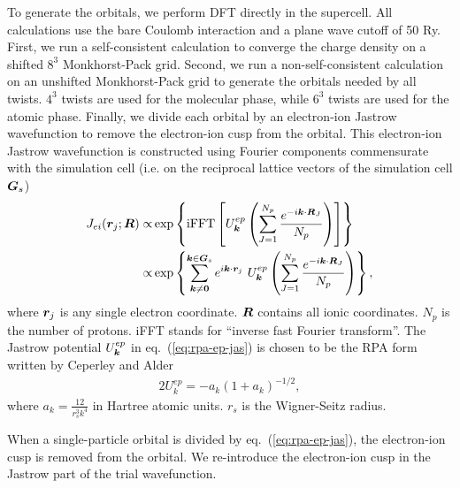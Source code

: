 To generate the orbitals, we perform DFT directly in the supercell. All calculations use the bare Coulomb interaction and a plane wave cutoff of 50 Ry. First, we run a self-consistent calculation to converge the charge density on a shifted $8^3$ Monkhorst-Pack grid. Second, we run a non-self-consistent calculation on an unshifted Monkhorst-Pack grid to generate the orbitals needed by all twists. $4^3$ twists are used for the molecular phase, while $6^3$ twists are used for the atomic phase. Finally, we divide each orbital by an electron-ion Jastrow wavefunction to remove the electron-ion cusp from the orbital. This electron-ion Jastrow wavefunction is constructed using Fourier components commensurate with the simulation cell (i.e. on the reciprocal lattice vectors of the simulation cell $\boldsymbol{G}_s$)
\begin{align}
J_{ei}(\boldsymbol{r}_j; \boldsymbol{R}) \propto& \exp\left\{ \text{iFFT}\left[ 
U_{\boldsymbol{k}}^{ep}  \left(\sum\limits_{J=1}^{N_p} \frac{e^{-i\boldsymbol{k}\cdot\boldsymbol{R}_J}}{N_p}  \right)
\right] \right\} \nonumber\\
\propto& \exp\left\{ 
\sum\limits_{\boldsymbol{k}\neq\boldsymbol{0}}^{\boldsymbol{k}\in\boldsymbol{G}_s} e^{i\boldsymbol{k}\cdot\boldsymbol{r}_j}~
U_{\boldsymbol{k}}^{ep} 
\left(\sum\limits_{J=1}^{N_p} \frac{e^{-i\boldsymbol{k}\cdot\boldsymbol{R}_J}}{N_p}  \right)
\right\},\label{eq:rpa-ep-jas}
\end{align}
where $\boldsymbol{r}_j$ is any single electron coordinate. $\boldsymbol{R}$ contains all ionic coordinates. $N_p$ is the number of protons. iFFT stands for ``inverse fast Fourier transform''. The Jastrow potential $U_{\boldsymbol{k}}^{ep}$ in eq.~(\ref{eq:rpa-ep-jas}) is chosen to be the RPA form written by Ceperley and Alder
\begin{align}
2U^{ep}_k = -a_k(1+a_k)^{-1/2},
\end{align}
where $a_k=\frac{12}{r_s^3k^4}$ in Hartree atomic units. $r_s$ is the Wigner-Seitz radius.

When a single-particle orbital is divided by eq.~(\ref{eq:rpa-ep-jas}), the electron-ion cusp is removed from the orbital. We re-introduce the electron-ion cusp in the Jastrow part of the trial wavefunction. 

